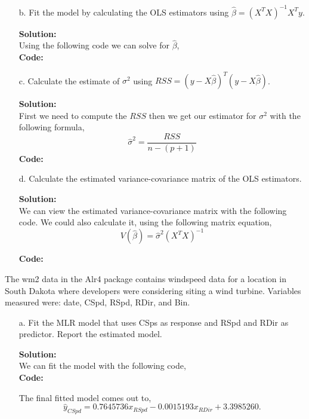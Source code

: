 \documentclass[12pt]{article}
\makeatletter
\theoremstyle{homework}
\newenvironment{exercise}[1]
{\def\@currentlabel{#1}\exercisecore}
{\endexercisecore}
\newcommand{\localhead}[1]{\par\smallskip\noindent\textbf{#1}\nobreak\\}%
\newcommand\solution{\localhead{Solution:}}
\makeatother
\begin{document}
\begin{exercise}{1}
\begin{enumerate}
     \item[b.] Fit the model by calculating the OLS estimators using $\hat{\beta} = (X^{T}X)^{-1}X^Ty$. 
     \solution Using the following code we can solve for $\hat{\beta}$, \\
     \textbf{Code:}
     \begin{center}
     
     \end{center} 
     \newpage



     \item[c.] Calculate the estimate of $\sigma^2$ using $RSS = (y - X\hat{\beta})^{T}(y - X\hat{\beta})$.\\
     \solution First we need to compute the $RSS$ then we get our estimator for $\sigma^2$ with the 
     following formula, 
     \begin{equation*}
       \hat{\sigma}^2 = \frac{RSS}{n - (p + 1)}
     \end{equation*}
     \textbf{Code:}
     \begin{center}
     
     \end{center} 
     \newpage

     \item[d.] Calculate the estimated variance-covariance matrix of the OLS estimators.\\
     \solution We can view the estimated variance-covariance matrix with the following code. We could also 
     calculate it, using the following matrix equation,
     \begin{equation*}
       V(\hat{\beta}) = \hat{\sigma}^2(X^TX)^{-1}
     \end{equation*}

     \textbf{Code:}
     \begin{center}
     
     \end{center} 
    \end{enumerate}
    \newpage



    \begin{exercise}{2} The wm2 data in the Alr4 package contains windspeed data for a location in South Dakota 
      where developers were considering siting a wind turbine. Variables measured were: date, CSpd, RSpd, RDir, and 
      Bin. \\
      \begin{enumerate}
        \item[a.] Fit the MLR model that uses CSps as response and RSpd and RDir as predictor. Report the estimated model.
        \solution We can fit the model with the following code, \\
        \textbf{Code:}
        \begin{center}
        
        \end{center} 
        The final fitted model comes out to, 
        \begin{equation*}
          \hat{y}_{CSpd} = 0.7645736x_{RSpd} -0.0015193x_{RDir} +3.3985260 .
        \end{equation*}
    \newpage


\end{enumerate}
\end{exercise}
\end{exercise}
\end{document}
